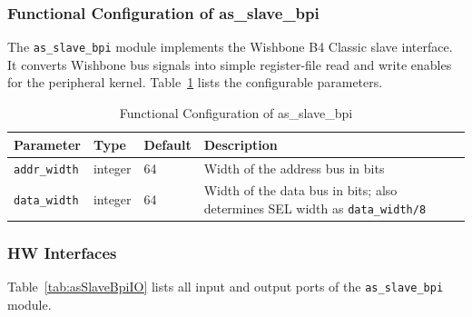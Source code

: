 \subsubsection{Functional Configuration of as\_slave\_bpi}

The \texttt{as\_slave\_bpi} module implements the Wishbone B4 Classic
slave interface.
It converts Wishbone bus signals into simple register-file read and write
enables for the peripheral kernel.
Table~\ref{tab:asSlaveBpiCfg} lists the configurable parameters.

\begin{table}[H]
\caption{Functional Configuration of as\_slave\_bpi}
\label{tab:asSlaveBpiCfg}
\centering
\begin{tabularx}{\textwidth}{|l |l |l |X|}
  \hline
  Parameter & Type & Default & Description \\
  \hline
  \hline
  \texttt{addr\_width} & integer & 64 & Width of the address bus in bits \\
  \hline
  \texttt{data\_width} & integer & 64 & Width of the data bus in bits; also determines SEL width as \texttt{data\_width/8} \\
  \hline
\end{tabularx}
\end{table}

\subsubsection{HW Interfaces}

Table~\ref{tab:asSlaveBpiIO} lists all input and output ports of the
\texttt{as\_slave\_bpi} module.

